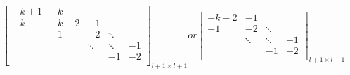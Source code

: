\documentclass[12pt]{amsart}
\theoremstyle{definition}
\theoremstyle{definition}
\begin{document}
			$$
			\begin{bmatrix}
				-k+1 & -k &  & &   \\
				-k & -k-2 & -1 & &   \\
				& -1 & -2 & \ddots&    \\
				&  & \ddots &\ddots & -1  \\
				&   &&-1 & -2   \\
			\end{bmatrix}_{l+1 \times l+1} or 
			\begin{bmatrix}
				-k-2 & -1 & &   \\
				-1 & -2 & \ddots&    \\
				& \ddots &\ddots & -1  \\
				&&-1 & -2   \\
			\end{bmatrix}_{l+1 \times l+1}
			$$
			
		
\end{document}
